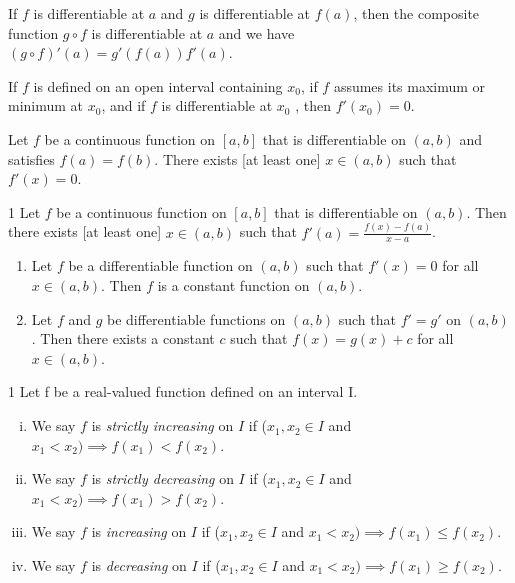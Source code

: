 \begin{theo}{1}
	If $f$ is differentiable at $a$ and $g$ is differentiable at $f(a)$, then the composite function $g \circ f$ is differentiable at $a$ and we have $(g\circ f)'(a) = g'(f(a))f'(a)$.
\end{theo}

\begin{theo}{1}
	If $f$ is defined on an open interval containing $x_0$, if $f$ assumes its	maximum or minimum at $x_0$, and if $f$ is differentiable at $x_0$ , then $f'(x_0) = 0$.
\end{theo}

\newpage

\begin{theo}{1}
	Let $f$ be a continuous function on $[a, b]$ that is differentiable on $(a, b)$ and satisfies $f (a) = f (b)$. There exists [at least one] $x \in (a, b)$ such that $f'(x) = 0$.
\end{theo}

\begin{theo}{1}
	Let $f$ be a continuous function on $[a, b]$ that is differentiable on $(a, b)$. Then there exists [at least one] $x \in (a, b)$ such that $f'(a) = \frac{f(x)-f(a)}{x-a}$.
	\begin{enumerate}
		\item Let $f$ be a differentiable function on $(a, b)$ such that $f'(x) = 0$ for all	$x \in (a, b)$. Then $f$ is a constant function on $(a, b)$.
		\item Let $f$ and $g$ be differentiable functions on $(a, b)$ such that $f' = g'$ on $(a, b)$. Then there exists a constant $c$ such that $f (x) = g(x) + c$ for	all $x \in (a, b)$.
	\end{enumerate}
\end{theo}

\begin{defn}{1}
	Let f be a real-valued function defined on an interval I. 
	\begin{enumerate}[(i)]
		\item We say $f$ is \textit{strictly increasing} on $I$ if ($x_1,x_2 \in I$ and $x_1 < x_2) \implies f(x_1) < f(x_2)$.
		\item We say $f$ is \textit{strictly decreasing} on $I$ if ($x_1,x_2 \in I$ and $x_1 < x_2) \implies f(x_1) > f(x_2)$.
		\item We say $f$ is \textit{increasing} on $I$ if ($x_1,x_2 \in I$ and $x_1 < x_2) \implies f(x_1) \leq f(x_2)$.
		\item We say $f$ is \textit{decreasing} on $I$ if ($x_1,x_2 \in I$ and $x_1 < x_2) \implies f(x_1) \geq f(x_2)$.
	\end{enumerate}
	
\end{defn}

